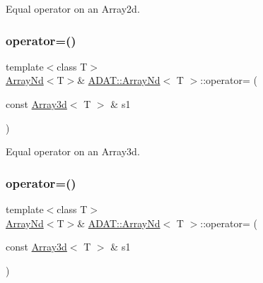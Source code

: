 Equal operator on an Array2d. 

\mbox{\label{classADAT_1_1ArrayNd_aa02a148fb7073245d21688eaa40d820b}} 
\subsubsection{\texorpdfstring{operator=()}{operator=()}\hspace{0.1cm}{\footnotesize\ttfamily [7/10]}}
{\footnotesize\ttfamily template$<$class T$>$ \\
\mbox{\hyperlink{classADAT_1_1ArrayNd}{Array\+Nd}}$<$T$>$\& \mbox{\hyperlink{classADAT_1_1ArrayNd}{A\+D\+A\+T\+::\+Array\+Nd}}$<$ T $>$\+::operator= (\begin{DoxyParamCaption}\item[{const \mbox{\hyperlink{classXMLArray_1_1Array3d}{Array3d}}$<$ T $>$ \&}]{s1 }\end{DoxyParamCaption})\hspace{0.3cm}{\ttfamily [inline]}}



Equal operator on an Array3d. 

\mbox{\label{classADAT_1_1ArrayNd_aa02a148fb7073245d21688eaa40d820b}} 
\subsubsection{\texorpdfstring{operator=()}{operator=()}\hspace{0.1cm}{\footnotesize\ttfamily [8/10]}}
{\footnotesize\ttfamily template$<$class T$>$ \\
\mbox{\hyperlink{classADAT_1_1ArrayNd}{Array\+Nd}}$<$T$>$\& \mbox{\hyperlink{classADAT_1_1ArrayNd}{A\+D\+A\+T\+::\+Array\+Nd}}$<$ T $>$\+::operator= (\begin{DoxyParamCaption}\item[{const \mbox{\hyperlink{classXMLArray_1_1Array3d}{Array3d}}$<$ T $>$ \&}]{s1 }\end{DoxyParamCaption})\hspace{0.3cm}{\ttfamily [inline]}}



